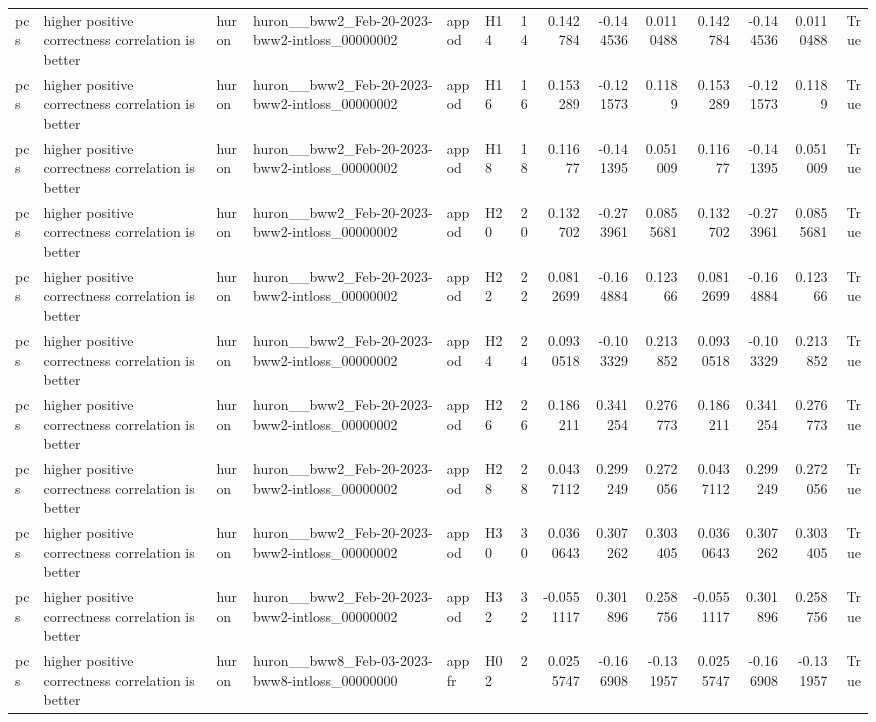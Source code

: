 \begin{longtable}{llllllrrrrrrrr}
pcs & higher positive correctness correlation is better & huron & huron\_\_bww2\_Feb-20-2023-bww2-intloss\_00000002 & appod & H14 & 14 & 0.142784 & -0.144536 & 0.0110488 & 0.142784 & -0.144536 & 0.0110488 & True \\
pcs & higher positive correctness correlation is better & huron & huron\_\_bww2\_Feb-20-2023-bww2-intloss\_00000002 & appod & H16 & 16 & 0.153289 & -0.121573 & 0.1189 & 0.153289 & -0.121573 & 0.1189 & True \\
pcs & higher positive correctness correlation is better & huron & huron\_\_bww2\_Feb-20-2023-bww2-intloss\_00000002 & appod & H18 & 18 & 0.11677 & -0.141395 & 0.051009 & 0.11677 & -0.141395 & 0.051009 & True \\
pcs & higher positive correctness correlation is better & huron & huron\_\_bww2\_Feb-20-2023-bww2-intloss\_00000002 & appod & H20 & 20 & 0.132702 & -0.273961 & 0.0855681 & 0.132702 & -0.273961 & 0.0855681 & True \\
pcs & higher positive correctness correlation is better & huron & huron\_\_bww2\_Feb-20-2023-bww2-intloss\_00000002 & appod & H22 & 22 & 0.0812699 & -0.164884 & 0.12366 & 0.0812699 & -0.164884 & 0.12366 & True \\
pcs & higher positive correctness correlation is better & huron & huron\_\_bww2\_Feb-20-2023-bww2-intloss\_00000002 & appod & H24 & 24 & 0.0930518 & -0.103329 & 0.213852 & 0.0930518 & -0.103329 & 0.213852 & True \\
pcs & higher positive correctness correlation is better & huron & huron\_\_bww2\_Feb-20-2023-bww2-intloss\_00000002 & appod & H26 & 26 & 0.186211 & 0.341254 & 0.276773 & 0.186211 & 0.341254 & 0.276773 & True \\
pcs & higher positive correctness correlation is better & huron & huron\_\_bww2\_Feb-20-2023-bww2-intloss\_00000002 & appod & H28 & 28 & 0.0437112 & 0.299249 & 0.272056 & 0.0437112 & 0.299249 & 0.272056 & True \\
pcs & higher positive correctness correlation is better & huron & huron\_\_bww2\_Feb-20-2023-bww2-intloss\_00000002 & appod & H30 & 30 & 0.0360643 & 0.307262 & 0.303405 & 0.0360643 & 0.307262 & 0.303405 & True \\
pcs & higher positive correctness correlation is better & huron & huron\_\_bww2\_Feb-20-2023-bww2-intloss\_00000002 & appod & H32 & 32 & -0.0551117 & 0.301896 & 0.258756 & -0.0551117 & 0.301896 & 0.258756 & True \\
pcs & higher positive correctness correlation is better & huron & huron\_\_bww8\_Feb-03-2023-bww8-intloss\_00000000 & appfr & H02 & 2 & 0.0255747 & -0.166908 & -0.131957 & 0.0255747 & -0.166908 & -0.131957 & True \\

\end{longtable}
